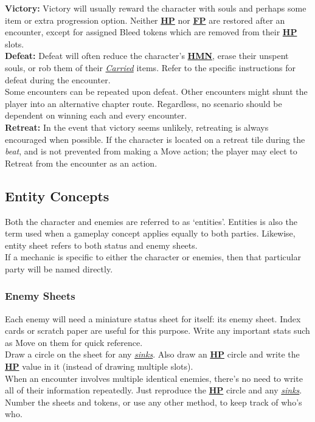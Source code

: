 \documentclass[12pt]{article}
\newcommand{\refto}[1]{\hyperlink{#1}{\textbf{#1}}}
\newcommand{\reftoit}[1]{\hyperlink{#1}{\emph{#1}}}
\begin{document}
\begin{multicols*}{2}
\textbf{Victory:} Victory will usually reward the character with souls and perhaps some item or extra progression option. Neither \refto{HP} nor \refto{FP} are restored after an encounter, except for assigned Bleed tokens which are removed from their \refto{HP} slots.\\

\textbf{Defeat:} Defeat will often reduce the character’s \refto{HMN}, erase their unspent souls, or rob them of their \reftoit{Carried} items. Refer to the specific instructions for defeat during the encounter.\\
Some encounters can be repeated upon defeat. Other encounters might shunt the player into an alternative chapter route. Regardless, no scenario should be dependent on winning each and every encounter.\\

\textbf{Retreat:} In the event that victory seems unlikely, retreating is always encouraged when possible. If the character is located on a retreat tile during the \emph{beat}, and is not prevented from making a Move action; the player may elect to Retreat from the encounter as an action.

\vfill
\pagebreak

\subsection{Entity Concepts}
Both the character and enemies are referred to as ‘entities’. Entities is also the term used when a gameplay concept applies equally to both parties. Likewise, entity sheet refers to both status and enemy sheets.\\
If a mechanic is specific to either the character or enemies, then that particular party will be named directly.

\subsubsection{Enemy Sheets}
Each enemy will need a miniature status sheet for itself: its enemy sheet. Index cards or scratch paper are useful for this purpose. Write any important stats such as Move on them for quick reference.\\
Draw a circle on the sheet for any \reftoit{sinks}. Also draw an \refto{HP} circle and write the \refto{HP} value in it (instead of drawing multiple slots). \\
When an encounter involves multiple identical enemies, there’s no need to write all of their information repeatedly. Just reproduce the \refto{HP} circle and any \reftoit{sinks}. Number the sheets and tokens, or use any other method, to keep track of who’s who.


\end{multicols*}
\end{document}
